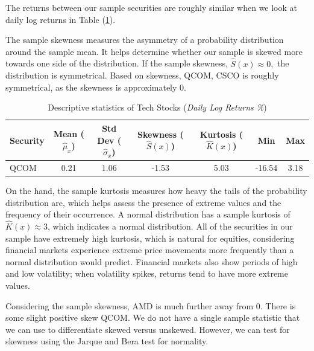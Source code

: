 \documentclass[12pt]{article}
\begin{document}
The returns between our sample securities are roughly similar when we look at daily log returns in Table (\ref{tab:log_descriptiv}).

The sample skewness measures the asymmetry of a probability distribution around the sample mean. It helps determine whether our sample is skewed more towards one side of the distribution. If the sample skewness, $\hat{S}(x)\approx 0,$ the distribution is symmetrical. Based on skewness, QCOM, CSCO is roughly symmetrical, as the skewness is approximately 0. 
\begin{table}[ht]
	\centering
	\caption{Descriptive statistics of Tech Stocks (\textit{Daily Log Returns \%})}
	\begin{tabular}[t]{lcccccc}
		\toprule
		Security & Mean ($\hat{\mu}_x$) & Std Dev ($\hat{\sigma}_x$) & Skewness ($\hat{S}(x)$) & Kurtosis ($\hat{K}(x)$) &Min&Max \\
		\midrule
		QCOM & 0.21 & 1.06 &-1.53 & 5.03 &-16.54 &3.18 \\	
		\bottomrule
	\end{tabular}\label{tab:log_descriptiv}
\end{table}
On the hand, the sample kurtosis measures how heavy the tails of the probability distribution are, which helps assess the presence of extreme values and the frequency of their occurrence. A normal distribution has a sample kurtosis of  $\hat{K}(x)\approx 3$, which indicates a normal distribution. All of the securities in our sample have extremely high kurtosis, which is natural for equities, considering financial markets experience extreme price movements more frequently than a normal distribution would predict. Financial markets also show periods of high and low volatility; when volatility spikes, returns tend to have more extreme values.

Considering the sample skewness, AMD is much further away from 0. There is some slight positive skew QCOM. We do not have a single sample statistic that we can use to differentiate skewed versus unskewed. However, we can test for skewness using the Jarque and Bera test for normality.
\end{document}
